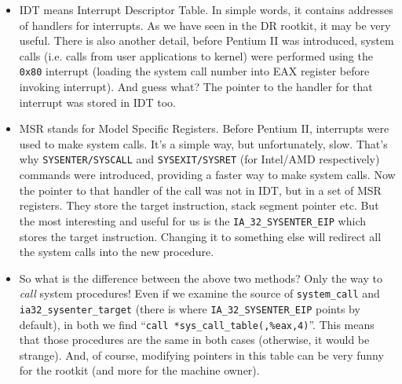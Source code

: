 \documentclass[12pt]{book}
\begin{document}
  \begin{itemize}
    \item IDT means Interrupt Descriptor Table. In simple words, it contains
      addresses of handlers for interrupts. As we have seen in the DR rootkit,
      it may be very useful. There is also another detail, before Pentium II
      was introduced, system calls (i.e. calls from user applications to
      kernel) were performed using the \verb!0x80!  interrupt (loading the
      system call number into EAX register before invoking interrupt). And
      guess what? The pointer to the handler for that interrupt was stored in
      IDT too.

    \item MSR stands for Model Specific Registers. Before Pentium II,
      interrupts were used to make system calls. It's a simple way, but
      unfortunately, slow. That's why \verb!SYSENTER/SYSCALL! and
      \verb!SYSEXIT/SYSRET! (for Intel/AMD respectively) commands were
      introduced, providing a faster way to make system calls. Now the pointer
      to that handler of the call was not in IDT, but in a set of MSR
      registers. They store the target instruction, stack segment pointer
      etc. But the most interesting and useful for us is the
      \verb!IA_32_SYSENTER_EIP! which stores the target instruction. Changing
      it to something else will redirect all the system calls into the new
      procedure.

    \item So what is the difference between the above two methods? Only the
      way to \emph{call} system procedures! Even if we examine the source of
      \verb!system_call! and \verb!ia32_sysenter_target! (there is where
      \verb!IA_32_SYSENTER_EIP!  points by default), in both we find
      ``\verb!call *sys_call_table(,%eax,4)!''. This means that those
      procedures are the same in both cases (otherwise, it would be
      strange). And, of course, modifying pointers in this table can be very
      funny for the rootkit (and more for the machine owner).
  \end{itemize}
\end{document}
